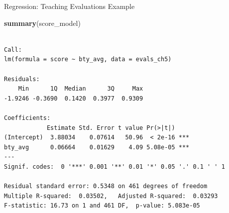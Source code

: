 \documentclass[
  ignorenonframetext,
]{beamer}
\newenvironment{Shaded}{\begin{snugshade}}{\end{snugshade}}
\newcommand{\FunctionTok}[1]{\textcolor[rgb]{0.13,0.29,0.53}{\textbf{#1}}}
\newcommand{\NormalTok}[1]{#1}
\begin{document}
\begin{frame}[fragile]{Regression: Teaching Evaluations Example}
\protect\hypertarget{regression-teaching-evaluations-example-8}{}
\small

\begin{Shaded}
\begin{Highlighting}[]
\FunctionTok{summary}\NormalTok{(score\_model)}
\end{Highlighting}
\end{Shaded}

\begin{verbatim}

Call:
lm(formula = score ~ bty_avg, data = evals_ch5)

Residuals:
    Min      1Q  Median      3Q     Max 
-1.9246 -0.3690  0.1420  0.3977  0.9309 

Coefficients:
            Estimate Std. Error t value Pr(>|t|)    
(Intercept)  3.88034    0.07614   50.96  < 2e-16 ***
bty_avg      0.06664    0.01629    4.09 5.08e-05 ***
---
Signif. codes:  0 '***' 0.001 '**' 0.01 '*' 0.05 '.' 0.1 ' ' 1

Residual standard error: 0.5348 on 461 degrees of freedom
Multiple R-squared:  0.03502,   Adjusted R-squared:  0.03293 
F-statistic: 16.73 on 1 and 461 DF,  p-value: 5.083e-05
\end{verbatim}

\normalsize
\end{frame}
\end{document}

